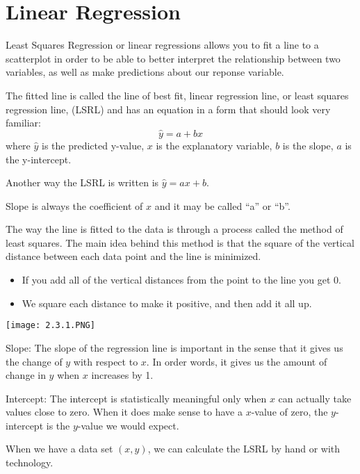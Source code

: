 \documentclass[../stats.tex]{subfiles}
\begin{document}
\section{Linear Regression}
Least Squares Regression or linear regressions allows you to fit a line to a scatterplot in order to be able to better interpret the relationship between two variables, as well as make predictions about our reponse variable.

The fitted line is called the line of best fit, linear regression line, or least squares regression line, (LSRL) and has an equation in a form that should look very familiar:
\[ \hat{y}=a+bx \]
where $\hat{y}$ is the predicted y-value, $x$ is the explanatory variable, $b$ is the slope, $a$ is the y-intercept.

Another way the LSRL is written is $\hat{y}=ax+b$. 

Slope is always the coefficient of $x$ and it may be called ``a'' or ``b''.

The way the line is fitted to the data is through a process called the method of least squares. The main idea behind this method is that the square of the vertical distance between each data point and the line is minimized.

\begin{itemize}
    \item If you add all of the vertical distances from the point to the line you get 0.
    \item We square each distance to make it positive, and then add it all up.
\end{itemize}

\begin{center}
    \texttt{[image: 2.3.1.PNG]}
\end{center}

Slope: The slope of the regression line is important in the sense that it gives us the change of $y$ with respect to $x$. In order words, it gives us the amount of change in $y$ when $x$ increases by 1.

Intercept: The intercept is statistically meaningful only when $x$ can actually take values close to zero. When it does make sense to have a $x$-value of zero, the $y$-intercept is the $y$-value we would expect.

When we have a data set $(x,y)$, we can calculate the LSRL by hand or with technology.
\end{document}
